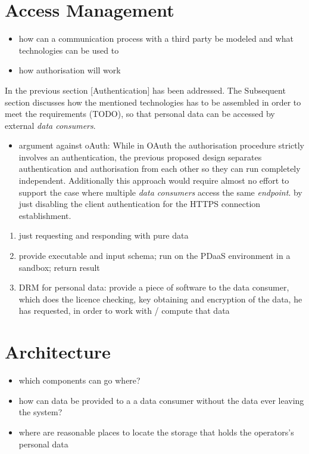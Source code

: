 \documentclass[12pt,english,a4paper,titlepage,cleardoublepage=empty,dottedtoc]{report}
\providecommand{\tightlist}{%
  \setlength{\itemsep}{0pt}\setlength{\parskip}{0pt}}
\begin{document}
\section{Access Management}\label{access-management}

\begin{itemize}
\tightlist
\item
  how can a communication process with a third party be modeled and what
  technologies can be used to
\item
  how authorisation will work
\end{itemize}

In the previous section {[}Authentication{]} has been addressed. The
Subsequent section discusses how the mentioned technologies has to be
assembled in order to meet the requirements (TODO), so that personal
data can be accessed by external \emph{data consumers}.

\begin{itemize}
\tightlist
\item
  argument against oAuth: While in OAuth the authorisation procedure
  strictly involves an authentication, the previous proposed design
  separates authentication and authorisation from each other so they can
  run completely independent. Additionally this approach would require
  almost no effort to support the case where multiple \emph{data
  consumers} access the same \emph{endpoint}. by just disabling the
  client authentication for the HTTPS connection establishment.
\end{itemize}

\begin{enumerate}
\def\labelenumi{\Alph{enumi})}
\tightlist
\item
  just requesting and responding with pure data
\item
  provide executable and input schema; run on the PDaaS environment in a
  sandbox; return result
\item
  DRM for personal data: provide a piece of software to the data
  consumer, which does the licence checking, key obtaining and
  encryption of the data, he has requested, in order to work with /
  compute that data
\end{enumerate}

\section{Architecture}\label{architecture}

\begin{itemize}
\tightlist
\item
  which components can go where?
\item
  how can data be provided to a a data consumer without the data ever
  leaving the system?
\item
  where are reasonable places to locate the storage that holds the
  operators's personal data
\end{itemize}
\end{document}
